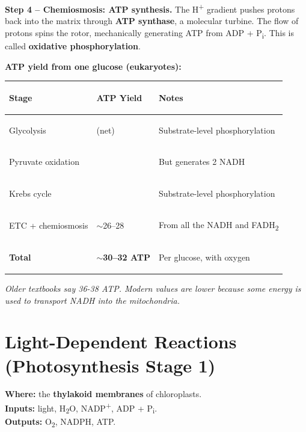 \documentclass[11pt, letterpaper]{article}
\begin{document}
\textbf{Step 4 -- Chemiosmosis: ATP synthesis.} The H\textsuperscript{+} gradient pushes
protons back into the matrix through \textbf{ATP synthase}, a molecular turbine. The flow
of protons spins the rotor, mechanically generating ATP from ADP + P\textsubscript{i}.
This is called \textbf{oxidative phosphorylation}.

\textbf{ATP yield from one glucose (eukaryotes):}

\noindent
{\renewcommand{\arraystretch}{1.4}
\begin{tabularx}{\textwidth}{>{\bfseries\raggedright\arraybackslash}p{4cm}
                              >{\centering\arraybackslash}p{2cm}
                              >{\raggedright\arraybackslash}X}
\toprule
\rowcolor{tableheaderteal}
\textbf{Stage} & \textbf{ATP Yield} & \textbf{Notes} \\
\midrule
\rowcolor{rowTe} Glycolysis            & 2 (net)  & Substrate-level phosphorylation \\
\rowcolor{rowA}  Pyruvate oxidation    & 0        & But generates 2 NADH \\
\rowcolor{rowTe} Krebs cycle           & 2        & Substrate-level phosphorylation \\
\rowcolor{rowA}  ETC + chemiosmosis    & $\sim$26--28 & From all the NADH and FADH\textsubscript{2} \\
\rowcolor{rowTe} \textbf{Total}        & \textbf{$\sim$30--32 ATP} & Per glucose, with oxygen \\
\bottomrule
\end{tabularx}}

\textit{Older textbooks say 36-38 ATP. Modern values are lower because some energy is used
to transport NADH into the mitochondria.}

\section*{Light-Dependent Reactions (Photosynthesis Stage 1)}

\textbf{Where:} the \textbf{thylakoid membranes} of chloroplasts.\\
\textbf{Inputs:} light, H\textsubscript{2}O, NADP\textsuperscript{+}, ADP + P\textsubscript{i}.\\
\textbf{Outputs:} O\textsubscript{2}, NADPH, ATP.
\end{document}

